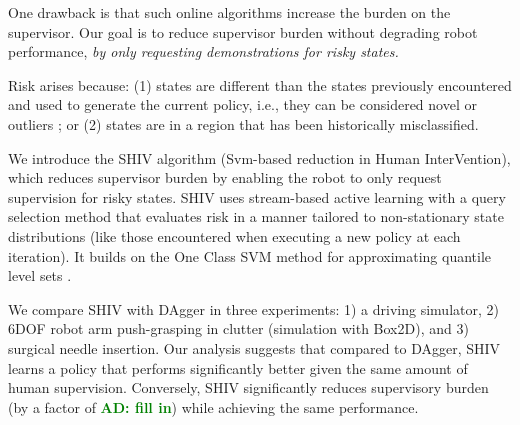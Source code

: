 \documentclass[10pt, conference]{ieeeconf}      %
\newcommand{\adnote}[1]{\ifthenelse{\boolean{include-notes}}%
 {\textcolor{green}{\textbf{AD: #1}}}{}}
\begin{document}
One drawback is that such online algorithms increase the burden on the supervisor. Our goal is to reduce supervisor burden without degrading robot performance, \emph{by only requesting demonstrations for risky states. }

Risk arises because:  (1) states are different than the states previously encountered and used to generate the current policy, i.e., they can be considered novel or outliers \cite{hodge2004survey}; or (2) states are in a region that  has been historically misclassified. 

We introduce the SHIV algorithm (Svm-based reduction in Human InterVention), which reduces supervisor burden by enabling the robot to only request supervision for risky states. SHIV uses stream-based active learning with a query selection method that evaluates risk in a manner tailored to non-stationary state distributions (like those encountered when executing a new policy at each iteration). It builds on the One Class SVM method for approximating quantile level sets \cite{scholkopf2001estimating}.

We compare SHIV with DAgger in three experiments: 1) a driving simulator, 2) 6DOF robot arm push-grasping in clutter (simulation with Box2D), and 3) surgical needle insertion. Our analysis suggests that compared to DAgger, SHIV learns a policy that performs significantly better given the same amount of human supervision. Conversely, SHIV significantly reduces supervisory burden (by a factor of \adnote{fill in}) while achieving the same performance. 








\end{document}
